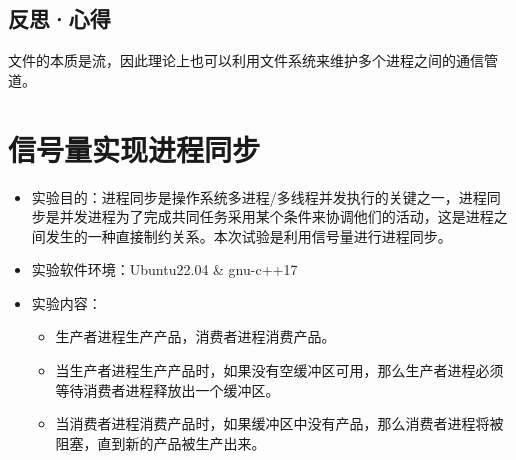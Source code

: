 \documentclass[UTF8]{ctexart}
\begin{document}
\subsection{反思·心得}
文件的本质是流，因此理论上也可以利用文件系统来维护多个进程之间的通信管道。
\clearpage
\section{信号量实现进程同步}
\begin{itemize}
	\item 实验目的：进程同步是操作系统多进程/多线程并发执行的关键之一，进程同步是并发进程为了完成共同任务采用某个条件来协调他们的活动，这是进程之间发生的一种直接制约关系。本次试验是利用信号量进行进程同步。
	\item 实验软件环境：Ubuntu22.04 \& gnu-c++17
	\item 实验内容：
	\begin{itemize}
		\item 生产者进程生产产品，消费者进程消费产品。
		\item 当生产者进程生产产品时，如果没有空缓冲区可用，那么生产者进程必须等待消费者进程释放出一个缓冲区。
		\item 当消费者进程消费产品时，如果缓冲区中没有产品，那么消费者进程将被阻塞，直到新的产品被生产出来。
	\end{itemize}
\end{itemize}
\end{document}
